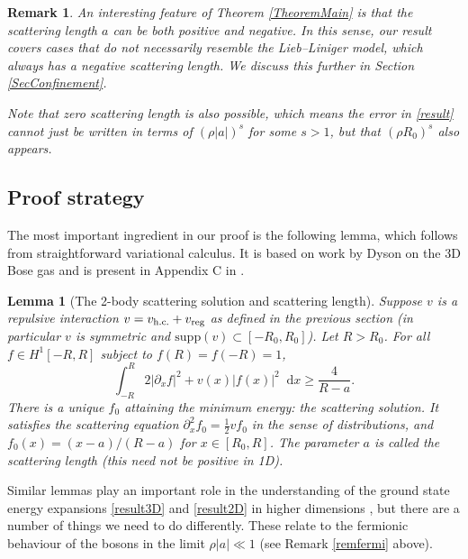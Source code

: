 \documentclass[a4paper,11pt]{article}
\newcommand{\supp}{\text{supp}}
\newcommand*\diff{\mathop{}\!\mathrm{d}}
\newtheorem{lemma}[theorem]{Lemma}
\newtheorem{remark}[theorem]{Remark}
\numberwithin{equation}{section}
\begin{document}
\begin{remark}
An interesting feature of Theorem \ref{TheoremMain} is that the scattering length $a$ can be both positive and negative. In this sense, our result covers cases that do not necessarily resemble the Lieb--Liniger model, which always has a negative scattering length. We discuss this further in Section \ref{SecConfinement}. 

Note that zero scattering length is also possible, which means the error in \eqref{result} cannot just be written in terms of $(\rho|a|)^s$ for some $s>1$, but that $(\rho R_0)^s$ also appears.
\end{remark}




\subsection{Proof strategy}
\label{SecProofidea}
The most important ingredient in our proof is the following lemma, which follows from straightforward variational calculus. It is based on work by Dyson on the 3D Bose gas \cite{dyson1957ground} and is present in Appendix C in \cite{lieb2006mathematics}.
\begin{lemma}[The 2-body scattering solution and scattering length]
\label{lemscatlength}
Suppose $v$ is a repulsive interaction  $v=v_{\textnormal{h.c.}}+v_{\textnormal{reg}}$ as defined in the previous section (in particular $v$ is symmetric and $\supp(v)\subset[-R_0,R_0]$). Let $R>R_0$. For all $f\in H^1[-R,R]$ subject to $f(R)=f(-R)=1$,
\begin{equation}
\label{dyson1}
\int^R_{-R}2|\partial_xf|^2+v(x)|f(x)|^2\diff x\geq \frac{4}{R-a}.
\end{equation}
There is a unique $f_0$ attaining the minimum energy: the scattering solution. It satisfies the scattering equation $\partial_x^2f_0=\frac12vf_0$ in the sense of distributions, and $f_0(x)=(x-a)/(R-a)$ for $x\in[R_0,R]$. The parameter $a$ is called the scattering length (this need not be positive in 1D). 
\end{lemma}
Similar lemmas play an important role in the understanding of the ground state energy expansions \eqref{result3D} and \eqref{result2D} in higher dimensions \cite{dyson1957ground,lieb1998ground,lieb2001ground}, but there are a number of things we need to do differently. These relate to the fermionic behaviour of the bosons in the limit $\rho|a|\ll1$ (see Remark \ref{remfermi} above). 
\end{document}
